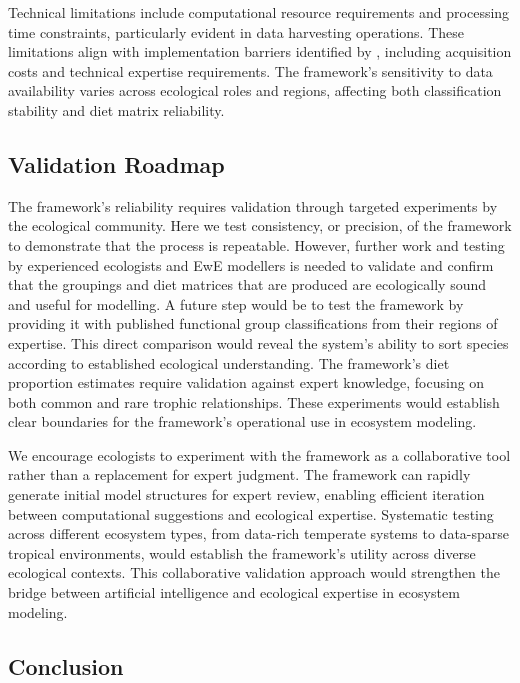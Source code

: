Technical limitations include computational resource requirements and processing time constraints, particularly evident in data harvesting operations. These limitations align with implementation barriers identified by \cite{Fernandes2024}, including acquisition costs and technical expertise requirements. The framework's sensitivity to data availability varies across ecological roles and regions, affecting both classification stability and diet matrix reliability.


\subsection{Validation Roadmap}

The framework's reliability requires validation through targeted experiments by the ecological community. Here we test consistency, or precision, of the framework to demonstrate that the process is repeatable. However, further work and testing by experienced ecologists and EwE modellers is needed to validate and confirm that the groupings and diet matrices that are produced are ecologically sound and useful for modelling. A future step would be to test the framework by providing it with published functional group classifications from their regions of expertise. This direct comparison would reveal the system's ability to sort species according to established ecological understanding. The framework's diet proportion estimates require validation against expert knowledge, focusing on both common and rare trophic relationships. These experiments would establish clear boundaries for the framework's operational use in ecosystem modeling.

We encourage ecologists to experiment with the framework as a collaborative tool rather than a replacement for expert judgment. The framework can rapidly generate initial model structures for expert review, enabling efficient iteration between computational suggestions and ecological expertise. Systematic testing across different ecosystem types, from data-rich temperate systems to data-sparse tropical environments, would establish the framework's utility across diverse ecological contexts. This collaborative validation approach would strengthen the bridge between artificial intelligence and ecological expertise in ecosystem modeling.

\subsection{Conclusion}

